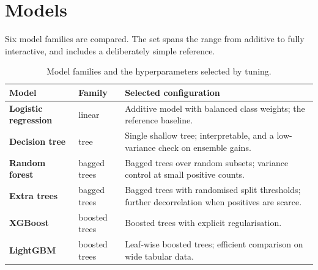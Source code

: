 \documentclass[10pt,openany]{report}
\begin{document}
\section{Models}

Six model families are compared. The set spans the range from additive to fully interactive, and
includes a deliberately simple reference.

\begin{table}[htbp]
\centering
\caption{Model families and the hyperparameters selected by tuning.}
\label{tab:models}
\small
\begin{tabular}{@{}p{2.6cm}p{2.3cm}p{9.2cm}@{}}
\toprule
\textbf{Model} & \textbf{Family} & \textbf{Selected configuration} \\
\midrule
\textbf{Logistic regression} & linear & Additive model with balanced class weights; the reference baseline.\par\vspace{2pt}{\footnotesize Tuned settings: $C=0.01$, $\ell_2$ penalty, balanced class weights} \\
\textbf{Decision tree} & tree & Single shallow tree; interpretable, and a low-variance check on ensemble gains.\par\vspace{2pt}{\footnotesize Tuned settings: depth 4, minimum leaf size 40, criterion entropy} \\
\textbf{Random forest} & bagged trees & Bagged trees over random subsets; variance control at small positive counts.\par\vspace{2pt}{\footnotesize Tuned settings: depth 6, minimum leaf size 10, features per split 0.3} \\
\textbf{Extra trees} & bagged trees & Bagged trees with randomised split thresholds; further decorrelation when positives are scarce.\par\vspace{2pt}{\footnotesize Tuned settings: depth 6, minimum leaf size 10, features per split 0.3} \\
\textbf{XGBoost} & boosted trees & Boosted trees with explicit regularisation.\par\vspace{2pt}{\footnotesize Tuned settings: depth 5, regularisation $\lambda=1.0$, minimum child weight 5} \\
\textbf{LightGBM} & boosted trees & Leaf-wise boosted trees; efficient comparison on wide tabular data.\par\vspace{2pt}{\footnotesize Tuned settings: leaves 31, minimum child samples 40, regularisation $\lambda=3.0$} \\
\bottomrule
\end{tabular}
\end{table}
\end{document}
